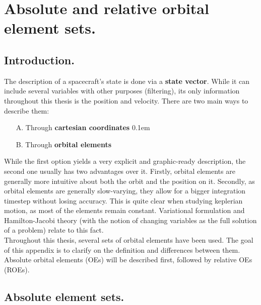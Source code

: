 \chapter{Absolute and relative orbital element sets.}
%
\label{app:App_A}
%
\section{Introduction.}
%
\indent The description of a spacecraft's state is done via a \textbf{state vector}. While it can include several variables with other purposes (\eg filtering), its only information throughout this thesis is the position and velocity. There are two main ways to describe them:
%
\begin{itemize}
\item[A.] Through \textbf{cartesian coordinates}
\itemsep0.1em 
\item[B.] Through \textbf{orbital elements}
\end{itemize}
%
\indent While the first option yields a very explicit and graphic-ready description, the second one usually has two advantages over it. Firstly, orbital elements are generally more intuitive about both the orbit and the position on it. Secondly, as orbital elements are generally slow-varying, they allow for a bigger integration timestep without losing accuracy. This is quite clear when studying keplerian motion, as most of the elements remain constant. Variational formulation and Hamilton-Jacobi theory (with the notion of changing variables as the full solution of a problem) relate to this fact. \\
%
\indent Throughout this thesis, several sets of orbital elements have been used. The goal of this appendix is to clarify on the definition and differences between them. Absolute orbital elements (OEs) will be described first, followed by relative OEs (ROEs).
%
\section{Absolute element sets.}
%
